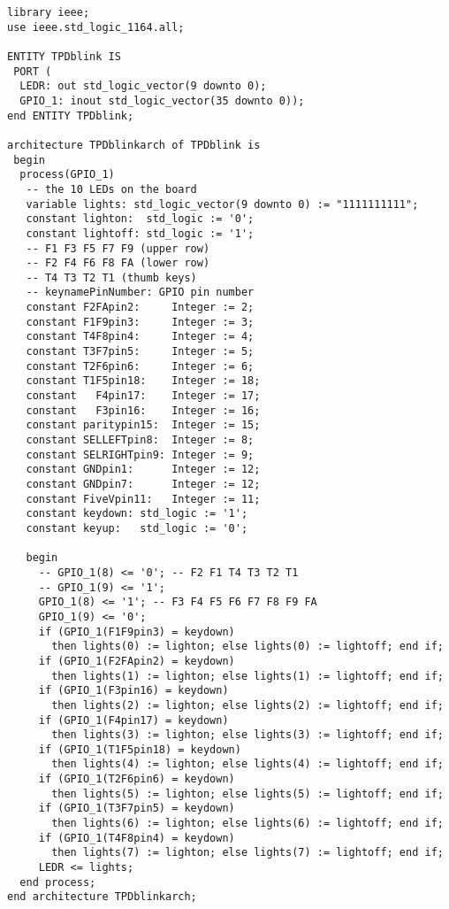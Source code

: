 \begin{verbatim}
library ieee;
use ieee.std_logic_1164.all;

ENTITY TPDblink IS 
 PORT (
  LEDR: out std_logic_vector(9 downto 0);
  GPIO_1: inout std_logic_vector(35 downto 0));
end ENTITY TPDblink;

architecture TPDblinkarch of TPDblink is
 begin 
  process(GPIO_1)
   -- the 10 LEDs on the board
   variable lights: std_logic_vector(9 downto 0) := "1111111111";
   constant lighton:  std_logic := '0';
   constant lightoff: std_logic := '1';
   -- F1 F3 F5 F7 F9 (upper row)
   -- F2 F4 F6 F8 FA (lower row)
   -- T4 T3 T2 T1 (thumb keys)
   -- keynamePinNumber: GPIO pin number
   constant F2FApin2:     Integer := 2;
   constant F1F9pin3:     Integer := 3;
   constant T4F8pin4:     Integer := 4;
   constant T3F7pin5:     Integer := 5;
   constant T2F6pin6:     Integer := 6;
   constant T1F5pin18:    Integer := 18;
   constant   F4pin17:    Integer := 17;
   constant   F3pin16:    Integer := 16;
   constant paritypin15:  Integer := 15;
   constant SELLEFTpin8:  Integer := 8;
   constant SELRIGHTpin9: Integer := 9;
   constant GNDpin1:      Integer := 12;
   constant GNDpin7:      Integer := 12;
   constant FiveVpin11:   Integer := 11;
   constant keydown: std_logic := '1';
   constant keyup:   std_logic := '0';

   begin 
     -- GPIO_1(8) <= '0'; -- F2 F1 T4 T3 T2 T1
     -- GPIO_1(9) <= '1';
     GPIO_1(8) <= '1'; -- F3 F4 F5 F6 F7 F8 F9 FA
     GPIO_1(9) <= '0';
     if (GPIO_1(F1F9pin3) = keydown) 
       then lights(0) := lighton; else lights(0) := lightoff; end if;
     if (GPIO_1(F2FApin2) = keydown) 
       then lights(1) := lighton; else lights(1) := lightoff; end if;
     if (GPIO_1(F3pin16) = keydown)
       then lights(2) := lighton; else lights(2) := lightoff; end if;
     if (GPIO_1(F4pin17) = keydown) 
       then lights(3) := lighton; else lights(3) := lightoff; end if;
     if (GPIO_1(T1F5pin18) = keydown)
       then lights(4) := lighton; else lights(4) := lightoff; end if;
     if (GPIO_1(T2F6pin6) = keydown)
       then lights(5) := lighton; else lights(5) := lightoff; end if;
     if (GPIO_1(T3F7pin5) = keydown)
       then lights(6) := lighton; else lights(6) := lightoff; end if;
     if (GPIO_1(T4F8pin4) = keydown)
       then lights(7) := lighton; else lights(7) := lightoff; end if;
     LEDR <= lights;
  end process;
end architecture TPDblinkarch;
\end{verbatim}

